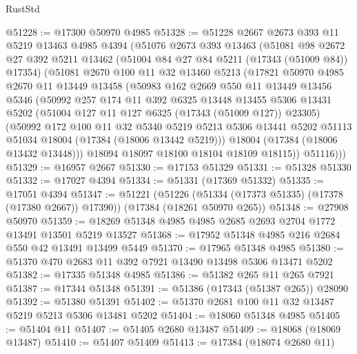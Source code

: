 \begin{lexlean}{RustStd}
\begin{coremodule}
@51228 := @17300 @50970 @4985
@51328 := @51228
    @2667
    @2673
    @393
    @11
    @5219
    @13463
    @4985
    @4394
    (@51076
      @2673
      @393
      @13463
      (@51081
        @98
        @2672
        @27
        @392
        @5211
        @13462
        (@51004 @84 @27 @84 @5211 (@17343 (@51009 @84)) @17354)
        (@51081
          @2670
          @100
          @11
          @32
          @13460
          @5213
          (@17821
            @50970
            @4985
            @2670
            @11
            @13449
            @13458
            (@50983
              @162
              @2669
              @550
              @11
              @13449
              @13456
              @5346
              (@50992
                @257
                @174
                @11
                @392
                @6325
                @13448
                @13455
                @5306
                @13431
                @5202
                (@51004 @127 @11 @127 @6325 (@17343 (@51009 @127)) @23305)
                (@50992
                  @172
                  @100
                  @11
                  @32
                  @5340
                  @5219
                  @5213
                  @5306
                  @13441
                  @5202
                  @51113
                  @51034
                  @18004
                  (@17384 (@18006 @13442 @5219)))
                @18004
                (@17384 (@18006 @13432 @13448)))
              @18094
              @18097
              @18100
              @18104
              @18109
              @18115))
          @51116)))
@51329 := @16957 @2667
@51330 := @17153 @51329
@51331 := @51328 @51330
@51332 := @17027 @4394
@51334 := @51331 (@17369 @51332)
@51335 := @17051 @4394
@51347 := @51221
    (@51226 (@51334 (@17373 @51335) (@17378 (@17380 @2667)) @17390))
    (@17384 (@18261 @50970 @265))
@51348 := @27908 @50970
@51359 := @18269 @51348 @4985 @4985 @2685 @2693 @2704 @1772 @13491 @13501 @5219 @13527
@51368 := @17952 @51348 @4985 @216 @2684 @550 @42 @13491 @13499 @5449
@51370 := @17965 @51348 @4985
@51380 := @51370 @470 @2683 @11 @392 @7921 @13490 @13498 @5306 @13471 @5202
@51382 := @17335 @51348 @4985
@51386 := @51382 @265 @11 @265 @7921
@51387 := @17344 @51348
@51391 := @51386 (@17343 (@51387 @265)) @28090
@51392 := @51380 @51391
@51402 := @51370 @2681 @100 @11 @32 @13487 @5219 @5213 @5306 @13481 @5202
@51404 := @18060 @51348 @4985
@51405 := @51404 @11
@51407 := @51405 @2680 @13487
@51409 := @18068 (@18069 @13487)
@51410 := @51407 @51409
@51413 := @17384 (@18074 @2680 @11)

\end{coremodule}
\end{lexlean}
